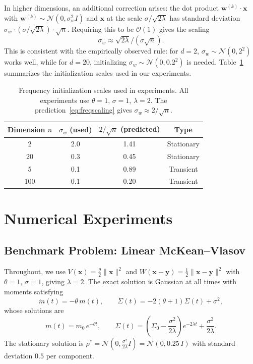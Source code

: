 \documentclass[12pt]{article}
\newcommand{\bx}{\mathbf{x}}
\newcommand{\by}{\mathbf{y}}
\newcommand{\bw}{\mathbf{w}}
\theoremstyle{plain}
\begin{document}
In higher dimensions, an additional correction arises: the dot product
$\bw^{(k)}\cdot\bx$ with $\bw^{(k)}\sim\mathcal{N}(0,\sigma_w^2 I)$ and $\bx$ at
the scale $\sigma/\sqrt{2\lambda}$ has standard deviation
$\sigma_w\cdot(\sigma/\sqrt{2\lambda})\cdot\sqrt{n}$. Requiring this to be
$\mathcal{O}(1)$ gives the scaling
\begin{equation}
  \sigma_w \approx \sqrt{2\lambda}/(\sigma\sqrt{n}).
  \label{eq:freqscaling}
\end{equation}
This is consistent with the empirically observed rule: for $d=2$,
$\sigma_w\sim\mathcal{N}(0,2^2)$ works well, while for $d=20$, initializing
$\sigma_w\sim\mathcal{N}(0,0.2^2)$ is needed.
Table~\ref{tab:freqscaling} summarizes the initialization scales used in our experiments.

\begin{table}[h]
\centering
\caption{Frequency initialization scales used in experiments. All experiments use
$\theta=1$, $\sigma=1$, $\lambda=2$. The prediction~\eqref{eq:freqscaling} gives
$\sigma_w\approx 2/\sqrt{n}$.}
\label{tab:freqscaling}
\begin{tabular}{cccc}
\toprule
Dimension $n$ & $\sigma_w$ (used) & $2/\sqrt{n}$ (predicted) & Type \\
\midrule
2  & 2.0 & 1.41 & Stationary \\
20 & 0.3 & 0.45 & Stationary \\
5  & 0.1 & 0.89 & Transient \\
100 & 0.1 & 0.20 & Transient \\
\bottomrule
\end{tabular}
\end{table}

\section{Numerical Experiments}
\label{sec:experiments}

\subsection{Benchmark Problem: Linear McKean--Vlasov}

Throughout, we use $V(\bx)=\frac{\theta}{2}\|\bx\|^2$ and
$W(\bx-\by)=\frac{1}{2}\|\bx-\by\|^2$ with $\theta=1$, $\sigma=1$, giving $\lambda=2$.
The exact solution is Gaussian at all times with moments satisfying
\begin{equation}
  \dot{m}(t) = -\theta\,m(t), \qquad
  \dot{\Sigma}(t) = -2(\theta+1)\Sigma(t)+\sigma^2,
  \label{eq:ODEs}
\end{equation}
whose solutions are
\begin{equation}
  m(t) = m_0\,e^{-\theta t}, \qquad
  \Sigma(t) = \left(\Sigma_0 - \frac{\sigma^2}{2\lambda}\right)e^{-2\lambda t}
    + \frac{\sigma^2}{2\lambda}.
  \label{eq:exact}
\end{equation}
The stationary solution is $\rho^*=\mathcal{N}(0,\frac{\sigma^2}{2\lambda}I)
=\mathcal{N}(0,0.25\,I)$ with standard deviation $0.5$ per component.
\end{document}
